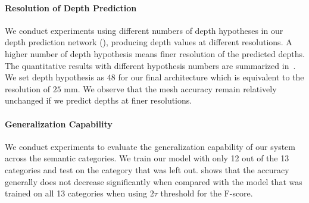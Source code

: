 \paragraph{Resolution of Depth Prediction}
We conduct experiments using different numbers of depth hypotheses in our depth prediction network (), producing depth values at different resolutions.
A higher number of depth hypothesis means finer resolution of the predicted depths.
The quantitative results with different hypothesis numbers are summarized in~. We set depth hypothesis as $48$ for our final architecture which is equivalent to the resolution of $25$ mm.
We observe that the mesh accuracy remain relatively unchanged if we predict depths at finer resolutions.


\vspace{-2mm}
\paragraph{Generalization Capability}
We conduct experiments to evaluate the generalization capability of our system across the semantic categories. We train our model with only 12 out of the 13 categories and test on the category that was left out.  shows that the accuracy generally does not decrease significantly when compared with the model that was trained on all 13 categories when using $2\tau$ threshold for the F-score.


